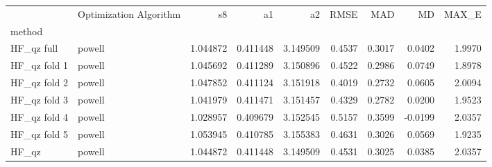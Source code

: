 \begin{tabular}{llrrrrrrr}
 & Optimization Algorithm & s8 & a1 & a2 & RMSE & MAD & MD & MAX_E \\
method &  &  &  &  &  &  &  &  \\
HF_qz full & powell & 1.044872 & 0.411448 & 3.149509 & 0.4537 & 0.3017 & 0.0402 & 1.9970 \\
HF_qz fold 1 & powell & 1.045692 & 0.411289 & 3.150896 & 0.4522 & 0.2986 & 0.0749 & 1.8978 \\
HF_qz fold 2 & powell & 1.047852 & 0.411124 & 3.151918 & 0.4019 & 0.2732 & 0.0605 & 2.0094 \\
HF_qz fold 3 & powell & 1.041979 & 0.411471 & 3.151457 & 0.4329 & 0.2782 & 0.0200 & 1.9523 \\
HF_qz fold 4 & powell & 1.028957 & 0.409679 & 3.152545 & 0.5157 & 0.3599 & -0.0199 & 2.0357 \\
HF_qz fold 5 & powell & 1.053945 & 0.410785 & 3.155383 & 0.4631 & 0.3026 & 0.0569 & 1.9235 \\
HF_qz & powell & 1.044872 & 0.411448 & 3.149509 & 0.4531 & 0.3025 & 0.0385 & 2.0357 \\
\end{tabular}
